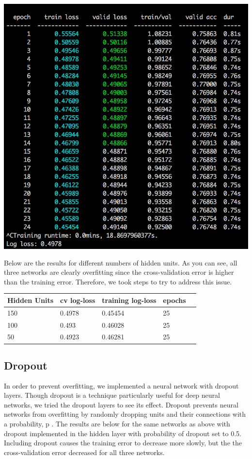 \documentclass[twoside,11pt]{article}
\theoremstyle{definition}
\begin{document}
      \begin{center}
        \includegraphics[scale=0.45]{nn1.jpg}
      \end{center}  

Below are the results for different numbers of hidden units. As you can see, all three networks are clearly overfitting since the cross-validation error is higher than the training error. Therefore, we took steps to try to address this issue. 

      \begin{center}
          \begin{tabular}{ | l | l | l | l | p{5cm} |}
          \hline
          Hidden Units & cv log-loss & training log-loss & epochs \\ \hline
          150 & 0.4978 & 0.45454 & 25 \\ \hline
          100 & 0.493 & 0.46028 & 25 \\ \hline
          50 & 0.4923 & 0.46281 & 25 \\ \hline 
          \end{tabular}
      \end{center}

\subsection{Dropout}
In order to prevent overfitting, we implemented a neural network with dropout layers. Though dropout is a technique particularly useful for deep neural networks, we tried the dropout layers to see its effect. Dropout prevents neural networks from overfitting by randomly dropping units and their connections with a probability, p .\cite{Dropout} The results are below for the same networks as above with dropout implemented in the hidden layer with probability of dropout set to 0.5. Including dropout causes the training error to decrease more slowly, but the the cross-validation error decreased for all three networks. 
\end{document}
